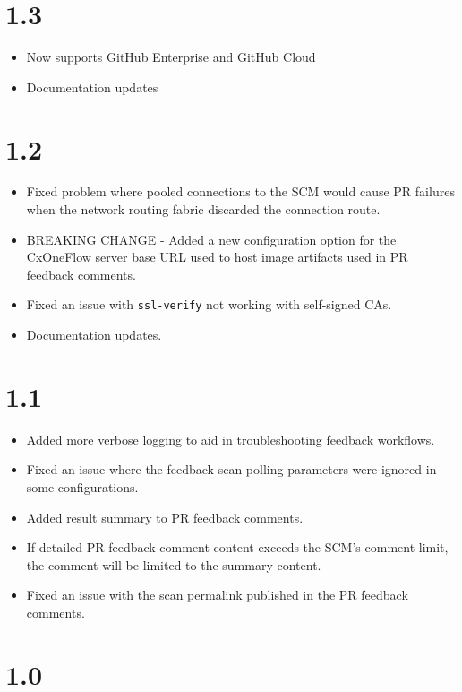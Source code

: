\section{1.3}

\begin{itemize}
    \item Now supports GitHub Enterprise and GitHub Cloud
    \item Documentation updates
\end{itemize}

\section{1.2}

\begin{itemize}
    \item Fixed problem where pooled connections to the SCM would cause PR failures when the network routing 
    fabric discarded the connection route.
    \item BREAKING CHANGE - Added a new configuration option for the CxOneFlow server base URL used to host image
    artifacts used in PR feedback comments.
    \item Fixed an issue with \texttt{ssl-verify} not working with self-signed CAs.
    \item Documentation updates.
\end{itemize}


\section{1.1}

\begin{itemize}
    \item Added more verbose logging to aid in troubleshooting feedback workflows.
    \item Fixed an issue where the feedback scan polling parameters were ignored in some configurations.
    \item Added result summary to PR feedback comments.
    \item If detailed PR feedback comment content exceeds the SCM's comment limit, the comment will be limited to the summary content.
    \item Fixed an issue with the scan permalink published in the PR feedback comments.
\end{itemize}


\section{1.0}

